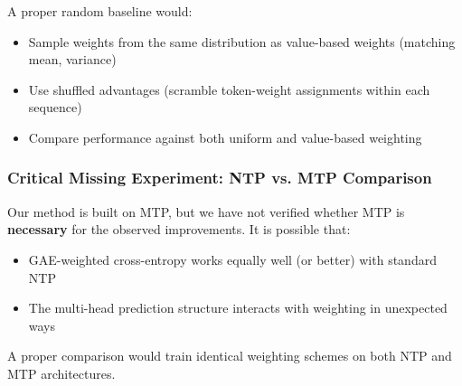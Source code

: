 A proper random baseline would:
\begin{itemize}[nosep]
    \item Sample weights from the same distribution as value-based weights (matching mean, variance)
    \item Use shuffled advantages (scramble token-weight assignments within each sequence)
    \item Compare performance against both uniform and value-based weighting
\end{itemize}

\subsubsection{Critical Missing Experiment: NTP vs. MTP Comparison}

Our method is built on MTP, but we have not verified whether MTP is \textbf{necessary} for the observed improvements. It is possible that:
\begin{itemize}[nosep]
    \item GAE-weighted cross-entropy works equally well (or better) with standard NTP
    \item The multi-head prediction structure interacts with weighting in unexpected ways
\end{itemize}

A proper comparison would train identical weighting schemes on both NTP and MTP architectures.

